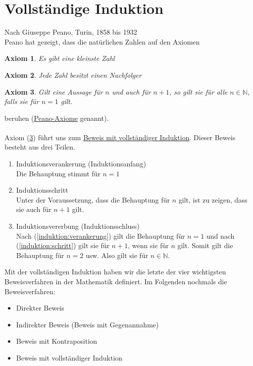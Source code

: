\documentclass{report}
\newtheorem{axiom}{Axiom}
\begin{document}
\section{Vollständige Induktion}
Nach Giuseppe Peano, Turin, 1858 bis 1932\\
Peano hat gezeigt, dass die natürlichen Zahlen auf den Axiomen
\begin{axiom}Es gibt eine kleinste Zahl\end{axiom}
\begin{axiom}Jede Zahl besitzt einen Nachfolger\end{axiom}
\begin{axiom}Gilt eine Aussage für $n$ und auch für $n + 1$, so gilt sie für alle $n \in \mathbb{N}$, falls sie für $n = 1$ gilt. \label{PeanoAxiom3}\end{axiom}
beruhen (\underline{Peano-Axiome} genannt).\\\\
Axiom (\ref{PeanoAxiom3}) führt uns zum \underline{Beweis mit vollständiger Induktion}. Dieser Beweis besteht aus drei Teilen.
\begin{enumerate}
\item Induktionsverankerung (Induktionsanfang) \label{induktion:verankerung}\\
Die Behauptung stimmt für $n = 1$
\item Induktionsschritt\label{induktion:schritt}\\
Unter der Voraussetzung, dass die Behauptung für $n$ gilt, ist zu zeigen, dass sie auch für $n+1$ gilt.
\item Induktionsvererbung (Induktionsschluss)\\
Nach (\ref{induktion:verankerung}) gilt die Behauptung für $n=1$ und nach (\ref{induktion:schritt}) gilt sie für $n+1$, wenn sie für $n$ gilt. Somit gilt die Behauptung für $n=2$ usw. Also gilt sie für $n \in \mathbb{N}$.\end{enumerate}

Mit der vollständigen Induktion haben wir die letzte der vier wichtigsten Beweisverfahren in der Mathematik definiert. Im Folgenden nochmals die Beweisverfahren:
\begin{itemize}\item Direkter Beweis
\item Indirekter Beweis (Beweis mit Gegenannahme)
\item Beweis mit Kontraposition
\item Beweis mit vollständiger Induktion\end{itemize}
\end{document}
